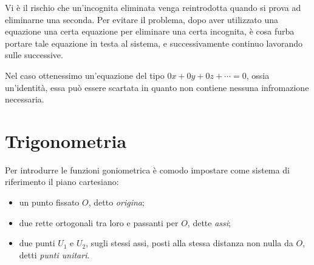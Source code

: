 \documentclass[a4paper]{article}
\begin{document}
Vi è il rischio che un'incognita eliminata venga reintrodotta quando si prova ad eliminarne una seconda.
Per evitare il problema, dopo aver utilizzato una equazione una certa equazione per eliminare una certa incognita,
è cosa furba portare tale equazione in testa al sistema, e successivamente continuo
lavorando sulle successive.


Nel caso ottenessimo un'equazione del tipo \(0x + 0y + 0z + \cdots = 0\), ossia un'identità,
essa può essere scartata in quanto non contiene nessuna infromazione necessaria.

\pagebreak

\section{Trigonometria}

Per introdurre le funzioni goniometrica è comodo impostare come sistema di riferimento
il piano cartesiano:
\begin{itemize}
    \item un punto fissato \(O\), detto \textit{origina};
    \item due rette ortogonali tra loro e passanti per \(O\), dette \textit{assi};
    \item due punti \(U_1\) e \(U_2\), sugli stessi assi, posti alla stessa distanza non nulla da \(O\),
    detti \textit{punti unitari}.
\end{itemize}
\end{document}
